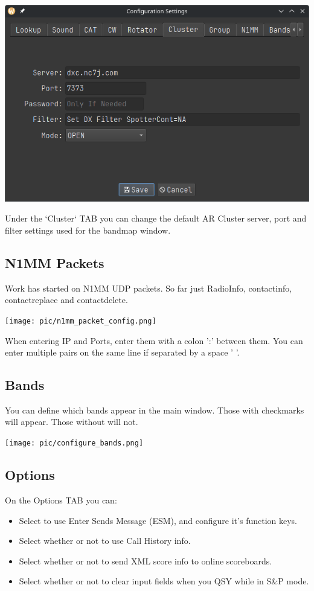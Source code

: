 \documentclass{article}
\begin{document}
\vspace{0.5cm}
\includegraphics[width=0.9\linewidth]{pic/configuration_cluster.png}
\vspace{0.5cm}

Under the `Cluster` TAB you can change the default AR Cluster server, port and filter settings used for the bandmap window.

\subsection{N1MM Packets}

Work has started on N1MM UDP packets. So far just RadioInfo, contactinfo, contactreplace and contactdelete.

\vspace{0.5cm}
\texttt{[image: pic/n1mm\_packet\_config.png]}
\vspace{0.5cm}

When entering IP and Ports, enter them with a colon ':' between them. You can enter multiple pairs on the same line if separated by a space ' '.

\subsection{Bands}
You can define which bands appear in the main window. Those with checkmarks will appear. Those without will not.

\vspace{0.5cm}
\texttt{[image: pic/configure\_bands.png]}
\vspace{0.5cm}

\subsection{Options}
On the Options TAB you can:
\begin{itemize}
\item Select to use Enter Sends Message (ESM), and configure it's function keys.
\item Select whether or not to use Call History info.
\item Select whether or not to send XML score info to online scoreboards.
\item Select whether or not to clear input fields when you QSY while in S\&P mode.
\end{itemize}
\end{document}
